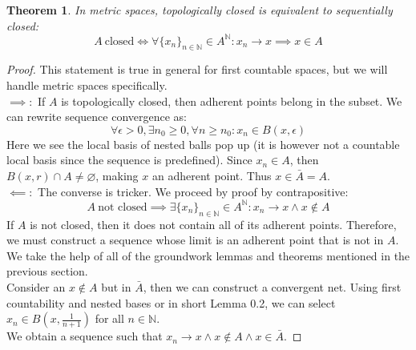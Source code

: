 \documentclass{exam}
\newtheorem{thm}{Theorem}[section]
\begin{document}
\begin{thm}
In metric spaces, topologically closed is equivalent to sequentially closed:
\begin{equation*}
  A \ \text{closed} \iff \forall \{x_n\}_{n \in \mathbb{N}} \in A^\mathbb{N}: x_n \xrightarrow{} x \implies x \in A
\end{equation*}
\end{thm}
\begin{proof}
This statement is true in general for first countable spaces, but we will handle metric spaces specifically.\\

$\implies:$ If $A$ is topologically closed, then adherent points belong in the subset. We can rewrite sequence convergence as:
\begin{equation*}
  \forall \epsilon > 0, \exists n_0 \geqslant 0, \forall n \geqslant n_0: x_n \in B(x, \epsilon)
\end{equation*}
Here we see the local basis of nested balls pop up (it is however not a countable local basis since the sequence is predefined). Since $x_n \in A$, then $B(x, r) \cap A \neq \varnothing$, making $x$ an adherent point. Thus $x \in \bar{A} = A$.\\

$\impliedby:$ The converse is tricker. We proceed by proof by contrapositive:
\begin{equation*}
  A \ \text{not closed} \implies \exists \{x_n\}_{n \in \mathbb{N}} \in A^\mathbb{N}: x_n \xrightarrow{} x \land x \notin A
\end{equation*}
If $A$ is not closed, then it does not contain all of its adherent points. Therefore, we must construct a sequence whose limit is an adherent point that is not in $A$. We take the help of all of the groundwork lemmas and theorems mentioned in the previous section.\\

Consider an $x \notin A$ but in $\bar{A}$, then we can construct a convergent net. Using first countability and nested bases or in short Lemma 0.2, we can select $x_n \in B\left(x, \frac{1}{n+1}\right)$ for all $n \in \mathbb{N}$.\\

We obtain a sequence such that $x_n \xrightarrow{} x \land x \notin A \land x \in \bar{A}$. 
\end{proof}
\end{document}
